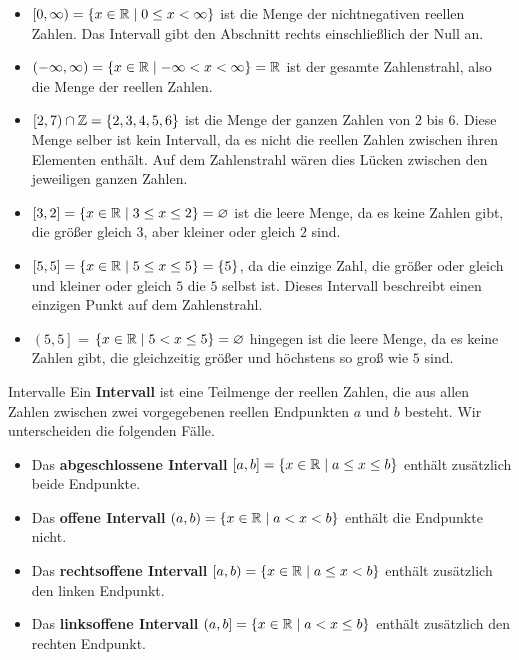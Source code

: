 \documentclass[../../main.tex]{subfiles}
\begin{document}
	\begin{example}{}
		\begin{itemize}
			\item $[0,\infty) = \{x \in \mathbb{R} \mid 0 \leq x < \infty\}$ ist die Menge der nichtnegativen reellen Zahlen. Das Intervall gibt den Abschnitt rechts einschließlich der Null an. 
			\item $(-\infty,\infty) = \{x \in \mathbb{R} \mid -\infty < x < \infty\} = \mathbb{R}$ ist der gesamte Zahlenstrahl, also die Menge der reellen Zahlen.
			\item $[2,7) \cap \mathbb{Z} = \{2,3,4,5,6\}$ ist die Menge der ganzen Zahlen von $2$ bis $6$. Diese Menge selber ist kein Intervall, da es nicht die reellen Zahlen zwischen ihren Elementen enthält. Auf dem Zahlenstrahl wären dies Lücken zwischen den jeweiligen ganzen Zahlen. 
			\item $[3,2] = \left\{ x \in \mathbb{R} \mid 3 \leq x \leq 2\right\} = \varnothing$ ist die leere Menge, da es keine Zahlen gibt, die größer gleich $3$, aber kleiner oder gleich $2$ sind.
			\item $[5,5] = \left\{ x \in \mathbb{R} \mid 5 \leq x \leq 5\right\} = \{5\}$, da die einzige Zahl, die größer oder gleich und kleiner oder gleich $5$ die $5$ selbst ist. Dieses Intervall beschreibt einen einzigen Punkt auf dem Zahlenstrahl.
			\item $\left(5,5\right]$ = $\left\{x \in \mathbb{R} \mid 5 < x \leq 5\right\} = \varnothing$ hingegen ist die leere Menge, da es keine Zahlen gibt, die gleichzeitig größer und höchstens so groß wie $5$ sind.
		\end{itemize}
	\end{example}

	\begin{definition}{Intervalle}
		Ein \textbf{Intervall} ist eine Teilmenge der reellen Zahlen, die aus allen Zahlen zwischen zwei vorgegebenen reellen Endpunkten $a$ und $b$ besteht. Wir unterscheiden die folgenden Fälle.
		\begin{itemize}
			\item Das \textbf{abgeschlossene Intervall} $[a,b] = \left\{ x \in \mathbb{R} \mid a \leq x \leq b\right\}$ enthält zusätzlich beide Endpunkte.
			\item Das \textbf{offene Intervall} $(a,b) = \left\{ x \in \mathbb{R} \mid a < x < b\right\}$ enthält die Endpunkte nicht.
			\item Das \textbf{rechtsoffene Intervall} $[a,b) = \left\{ x \in \mathbb{R} \mid a \leq x < b\right\}$ enthält zusätzlich  den linken Endpunkt.
			\item Das \textbf{linksoffene Intervall} $(a,b] = \left\{ x \in \mathbb{R} \mid a < x \leq b\right\}$ enthält zusätzlich den rechten Endpunkt.
		\end{itemize}
	\end{definition}
\end{document}
